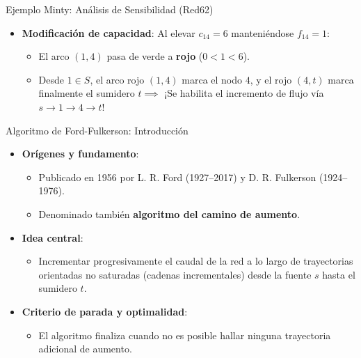 \documentclass[
  ignorenonframetext,
]{beamer}
\providecommand{\tightlist}{%
  \setlength{\itemsep}{0pt}\setlength{\parskip}{0pt}}
\begin{document}
\begin{frame}{Ejemplo Minty: Análisis de Sensibilidad (Red62)}
\label{ejemplo-minty-anuxe1lisis-de-sensibilidad-red62}
\begin{itemize}
\tightlist
\item
  \textbf{Modificación de capacidad}: Al elevar \(c_{14} = 6\)
  manteniéndose \(f_{14} = 1\):

  \begin{itemize}
  \tightlist
  \item
    El arco \((1,4)\) pasa de verde a \textbf{rojo} (\(0 < 1 < 6\)).
  \item
    Desde \(1 \in S\), el arco rojo \((1,4)\) marca el nodo \(4\), y el
    rojo \((4,t)\) marca finalmente el sumidero \(t \implies\) ¡Se
    habilita el incremento de flujo vía \(s \to 1 \to 4 \to t\)!
  \end{itemize}
\end{itemize}
\end{frame}

\begin{frame}{Algoritmo de Ford-Fulkerson: Introducción}
\label{algoritmo-de-ford-fulkerson-introducciuxf3n}
\begin{itemize}
\tightlist
\item
  \textbf{Orígenes y fundamento}:

  \begin{itemize}
  \tightlist
  \item
    Publicado en 1956 por L. R. Ford (1927--2017) y D. R. Fulkerson
    (1924--1976).
  \item
    Denominado también \textbf{algoritmo del camino de aumento}.
  \end{itemize}
\item
  \textbf{Idea central}:

  \begin{itemize}
  \tightlist
  \item
    Incrementar progresivamente el caudal de la red a lo largo de
    trayectorias orientadas no saturadas (cadenas incrementales) desde
    la fuente \(s\) hasta el sumidero \(t\).
  \end{itemize}
\item
  \textbf{Criterio de parada y optimalidad}:

  \begin{itemize}
  \tightlist
  \item
    El algoritmo finaliza cuando no es posible hallar ninguna
    trayectoria adicional de aumento.
  \end{itemize}
\end{itemize}
\end{frame}
\end{document}
